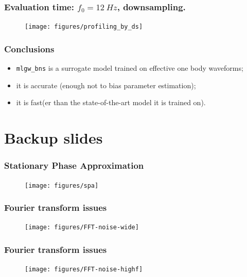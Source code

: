 \documentclass{beamer}
\begin{document}
\begin{frame}
    \frametitle{Evaluation time: \(f_0 = \SI{12}{Hz}\), downsampling.}    
    \begin{figure}[ht]
    \centering
    \vspace*{-.3cm}
    \texttt{[image: figures/profiling\_by\_ds]}
    \label{fig:profiling_by_ds}
    \end{figure}
\end{frame}


\begin{frame}
    \frametitle{Conclusions}
    \begin{itemize}
        \item \texttt{mlgw\_bns} is a surrogate model trained on effective one body waveforms;
        \item it is accurate (enough not to bias parameter estimation);
        \item it is fast(er than the state-of-the-art model it is trained on).
    \end{itemize}
\end{frame}

\section{Backup slides}

\begin{frame}
    \frametitle{Stationary Phase Approximation}
    \begin{figure}[ht]
    \centering
    \texttt{[image: figures/spa]}
    \label{fig:spa}
    \end{figure}
\end{frame}

\begin{frame}
    \frametitle{Fourier transform issues}
    
    \begin{figure}[ht]
    \centering
    \texttt{[image: figures/FFT-noise-wide]}
    \label{fig:fft-noise-wide}
    \end{figure}
\end{frame}

\begin{frame}
    \frametitle{Fourier transform issues}
    \begin{figure}[ht]
    \centering
    \texttt{[image: figures/FFT-noise-highf]}
    \label{fig:fft-noise-highf}
    \end{figure}
\end{frame}
\end{document}
